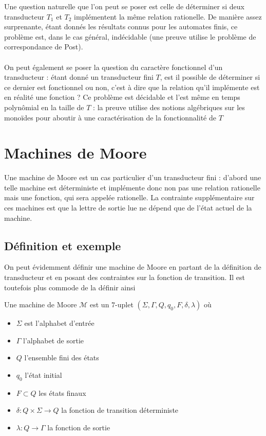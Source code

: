 \documentclass{scrartcl}
\begin{document}
\begin{flushleft}
Une question naturelle que l'on peut se poser est celle de déterminer si deux transducteur $T_1$ et $T_2$ implémentent la même relation rationelle.
De manière assez surprenante, étant donnés les résultats connus pour les automates finis, ce problème est, dans le cas général, indécidable \cite{indecEqu} (une
preuve utilise le problème de correspondance de Post).
\\~\\
On peut également se poser la question du caractère fonctionnel d'un transducteur : étant donné un transducteur fini $T$, est il possible de déterminer
si ce dernier est fonctionnel ou non, c'est à dire que la relation qu'il implémente est en réalité une fonction ? Ce problème est décidable
\cite{sakarovitch} et l'est même en temps polynômial en la taille de $T$ : la preuve utilise des notions algébriques sur les monoïdes pour
aboutir à une caractérisation de la fonctionnalité de $T$

\section{Machines de Moore}

Une machine de Moore est un cas particulier d'un transducteur fini : d'abord une telle machine est déterministe
et implémente donc non pas une relation rationelle mais une fonction, qui sera appelée rationelle. La contrainte
supplémentaire sur ces machines est que la lettre de sortie lue ne dépend que de l'état actuel de la machine.

\subsection{Définition et exemple}

On peut évidemment définir une machine de Moore en partant de la définition de transducteur et en posant des
contraintes sur la fonction de transition. Il est toutefois plus commode de la définir ainsi

\begin{define}
    Une machine de Moore $\mathcal{M}$ est un $7$-uplet $(\Sigma, \Gamma, Q, q_0, F, \delta, \lambda)$ où
    \begin{itemize}
        \item $\Sigma$ est l'alphabet d'entrée
        \item $\Gamma$ l'alphabet de sortie
        \item $Q$ l'ensemble fini des états
        \item $q_0$ l'état initial
        \item $F \subset Q$ les états finaux
        \item $\delta : Q \times \Sigma \rightarrow Q$ la fonction de transition déterministe
        \item $\lambda : Q \rightarrow \Gamma$ la fonction de sortie
    \end{itemize}
\end{define}


\end{flushleft}
\end{document}
